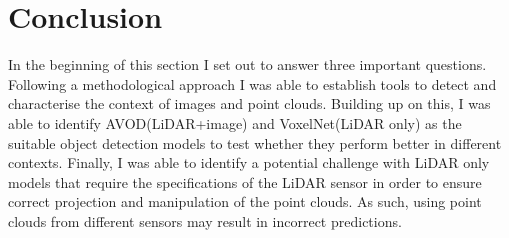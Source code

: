 \section{Conclusion}
In the beginning of this section I set out to answer three important questions. Following a methodological approach I was able to establish tools to detect and characterise the context of images and point clouds. Building up on this, I was able to identify AVOD(LiDAR+image) and VoxelNet(LiDAR only) as the suitable object detection models to test whether they perform better in different contexts.
Finally, I was able to identify a potential challenge with LiDAR only models that require the specifications of the LiDAR sensor in order to ensure correct projection and manipulation of the point clouds. As such, using point clouds from different sensors may result in incorrect predictions. 